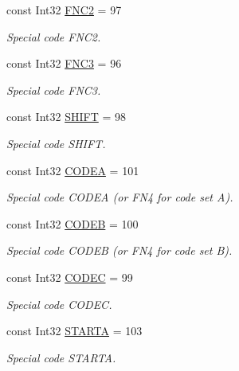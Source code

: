 \begin{DoxyCompactItemize}
const Int32 \hyperlink{class_pdf_file_writer_1_1_barcode128_aaddb69fdef1843d72c146b1afb6424f1}{F\+N\+C2} = 97
\begin{DoxyCompactList}\small\item\em Special code F\+N\+C2. \end{DoxyCompactList}\item 
const Int32 \hyperlink{class_pdf_file_writer_1_1_barcode128_a1f3d44fe6f59c7e563ae4fbf944aed44}{F\+N\+C3} = 96
\begin{DoxyCompactList}\small\item\em Special code F\+N\+C3. \end{DoxyCompactList}\item 
const Int32 \hyperlink{class_pdf_file_writer_1_1_barcode128_a2ff0b27d774c95fa62db0b2921a3f738}{S\+H\+I\+FT} = 98
\begin{DoxyCompactList}\small\item\em Special code S\+H\+I\+FT. \end{DoxyCompactList}\item 
const Int32 \hyperlink{class_pdf_file_writer_1_1_barcode128_a82ca5f862cf6ecb1044d854ca5c3d392}{C\+O\+D\+EA} = 101
\begin{DoxyCompactList}\small\item\em Special code C\+O\+D\+EA (or F\+N4 for code set A). \end{DoxyCompactList}\item 
const Int32 \hyperlink{class_pdf_file_writer_1_1_barcode128_aaf7f865d49a48148913b8a56699083cd}{C\+O\+D\+EB} = 100
\begin{DoxyCompactList}\small\item\em Special code C\+O\+D\+EB (or F\+N4 for code set B). \end{DoxyCompactList}\item 
const Int32 \hyperlink{class_pdf_file_writer_1_1_barcode128_a0e75cdd680e6c12252856f386d729db1}{C\+O\+D\+EC} = 99
\begin{DoxyCompactList}\small\item\em Special code C\+O\+D\+EC. \end{DoxyCompactList}\item 
const Int32 \hyperlink{class_pdf_file_writer_1_1_barcode128_a053decef1788fedf3764055e70452936}{S\+T\+A\+R\+TA} = 103
\begin{DoxyCompactList}\small\item\em Special code S\+T\+A\+R\+TA. \end{DoxyCompactList}\item 

\end{DoxyCompactItemize}
